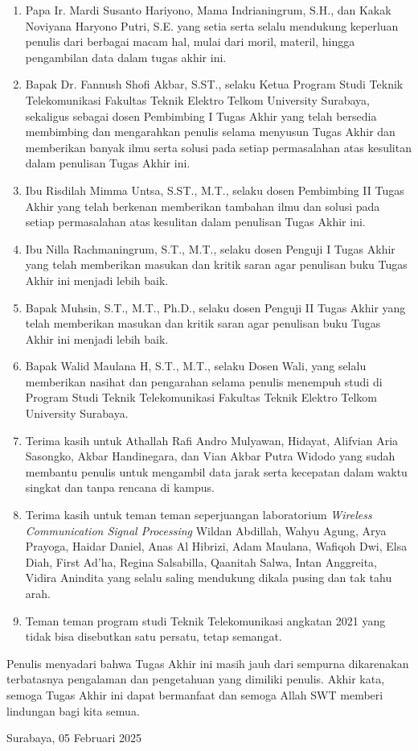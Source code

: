 \begin{enumerate}
    \item Papa Ir. Mardi Susanto Hariyono, Mama Indrianingrum, S.H., dan Kakak Noviyana Haryono Putri, S.E. yang setia serta selalu mendukung keperluan penulis dari berbagai macam hal, mulai dari moril, materil, hingga pengambilan data dalam tugas akhir ini.
    \item Bapak Dr. Fannush Shofi Akbar, S.ST., selaku Ketua Program Studi Teknik Telekomunikasi Fakultas Teknik Elektro Telkom University Surabaya, sekaligus sebagai dosen Pembimbing I Tugas Akhir yang telah bersedia membimbing dan mengarahkan penulis selama menyusun Tugas Akhir dan memberikan banyak ilmu serta solusi pada setiap permasalahan atas kesulitan dalam penulisan Tugas Akhir ini.
    \item Ibu Risdilah Mimma Untsa, S.ST., M.T., selaku dosen Pembimbing II Tugas Akhir yang telah berkenan memberikan tambahan ilmu dan solusi pada setiap permasalahan atas kesulitan dalam penulisan Tugas Akhir ini.
    \item Ibu Nilla Rachmaningrum, S.T., M.T., selaku dosen Penguji I Tugas Akhir yang telah memberikan masukan dan kritik saran agar penulisan buku Tugas Akhir ini menjadi lebih baik.
    \item Bapak Muhsin, S.T., M.T., Ph.D., selaku dosen Penguji II Tugas Akhir yang telah memberikan masukan dan kritik saran agar penulisan buku Tugas Akhir ini menjadi lebih baik.
    \item Bapak Walid Maulana H, S.T., M.T., selaku Dosen Wali, yang selalu memberikan nasihat dan pengarahan selama penulis menempuh studi di Program Studi Teknik Telekomunikasi Fakultas Teknik Elektro Telkom University Surabaya.
    \item Terima kasih untuk Athallah Rafi Andro Mulyawan, Hidayat, Alifvian Aria Sasongko, Akbar Handinegara, dan Vian Akbar Putra Widodo yang sudah membantu penulis untuk mengambil data jarak serta kecepatan dalam waktu singkat dan tanpa rencana di kampus.
    \item Terima kasih untuk teman teman seperjuangan laboratorium \textit{Wireless Communication Signal Processing} Wildan Abdillah, Wahyu Agung, Arya Prayoga, Haidar Daniel, Anas Al Hibrizi, Adam Maulana, Wafiqoh Dwi, Elsa Diah, First Ad'ha, Regina Salsabilla, Qaanitah Salwa, Intan Anggreita, Vidira Anindita yang selalu saling mendukung dikala pusing dan tak tahu arah.
    \item Teman teman program studi Teknik Telekomunikasi angkatan 2021 yang tidak bisa disebutkan satu persatu, tetap semangat.
\end{enumerate}

Penulis menyadari bahwa Tugas Akhir ini masih jauh dari sempurna dikarenakan terbatasnya pengalaman dan pengetahuan yang dimiliki penulis. Akhir kata, semoga Tugas Akhir ini dapat bermanfaat dan semoga Allah SWT memberi lindungan bagi kita semua.

 
\vspace*{0.1cm}
\begin{flushright}
Surabaya, 05 Februari 2025\\[0.1cm]
\vspace*{1cm}
\penulis

\end{flushright}